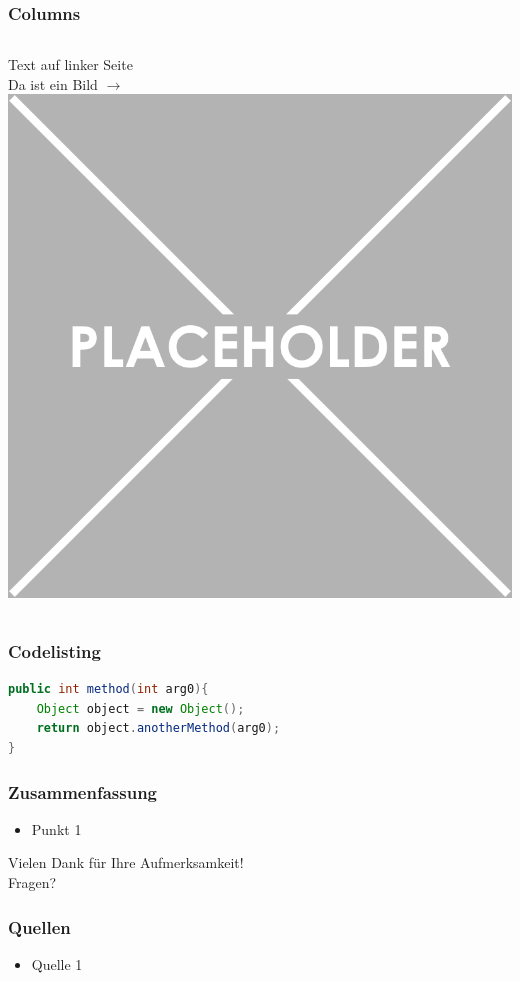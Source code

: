 \documentclass[xcolor=dvipsnames]{beamer}
\begin{document}
\begin{frame}\frametitle{Columns}
	\begin{columns}[t,onlytextwidth]
			Text auf linker Seite\\
			Da ist ein Bild $\rightarrow$
		\centering
		\includegraphics[width=1.0\textwidth,valign=t]{pictures/placeholder}
	\end{columns}
\end{frame}

\begin{frame}[fragile]\frametitle{Codelisting}
\begin{lstlisting}[language=Java]
public int method(int arg0){
    Object object = new Object();
    return object.anotherMethod(arg0);
}
\end{lstlisting}
\end{frame}

\begin{frame}\frametitle{Zusammenfassung}
	\begin{itemize}
		\item Punkt 1
	\end{itemize}
\end{frame}

\begin{frame}
	\centering
	\textcolor{htwgreen}{{\LARGE Vielen Dank für Ihre Aufmerksamkeit!\\[6ex] Fragen?}}
\end{frame}

\begin{frame}\frametitle{Quellen}
		\begin{itemize}
		\item Quelle 1
	\end{itemize}
\end{frame}
\end{document}
